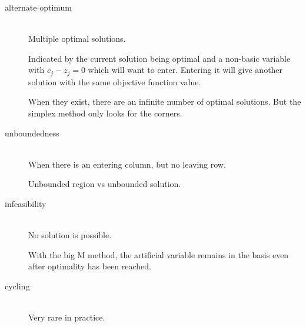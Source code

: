 \documentclass[a4paper, 12pt]{article}
\begin{document}
\begin{description}

\item[alternate optimum] \hfill \\
    Multiple optimal solutions.
    
    Indicated by the current solution being optimal and a non-basic variable
    with $c_j-z_j = 0$ which will want to enter. Entering it will give
    another solution with the same objective function value.
    
    When they exist, there are an infinite number of optimal solutions. But the
    simplex method only looks for the corners.

\item[unboundedness] \hfill \\
    When there is an entering column, but no leaving row.
    
    Unbounded region vs unbounded solution.

\item[infeasibility] \hfill \\
    No solution is possible.
    
    With the big M method, the artificial variable remains in the basis even
    after optimality has been reached.

\item[cycling] \hfill \\
    Very rare in practice.

\end{description}
\end{document}
